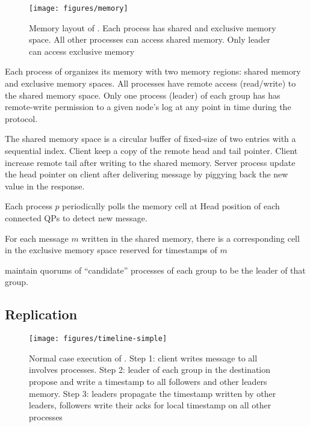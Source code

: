 \begin{figure}[ht!]
  \centering
  \texttt{[image: figures/memory]}
  \caption{Memory layout of \libname. Each process has shared and exclusive memory
  space. All other processes can access shared memory. Only leader can access
  exclusive memory }
  \label{fig:normal_operation_time}
\end{figure}


Each process of \libname organizes its memory with two memory regions: shared
memory and exclusive memory spaces. All processes have remote access
(read/write) to the shared memory space. Only one process (leader) of each group
has has remote-write permission to a given node’s log at any point in time
during the protocol.

The shared memory space is a circular buffer of fixed-size of two entries with a
sequential index. Client keep a copy of the remote head and tail pointer. Client
increase remote tail after writing to the shared memory. Server process update
the head pointer on client after delivering message by piggying back the new
value in the response.

Each process $p$ periodically polls the memory cell at Head position of each
connected QPs to detect new message.

For each message $m$ written in the shared memory, there is a corresponding cell
in the exclusive memory space reserved for timestamps of $m$

\libname maintain quorums of ``candidate'' processes of each group to be the leader of that group.

\subsection{Replication}

\begin{figure}[ht!]
  \centering
  \texttt{[image: figures/timeline-simple]}
  \caption{Normal case execution of \libname. Step 1: client writes message to all
          involves processes. Step 2: leader of each group in the destination
          propose and write a timestamp to all followers and other leaders
          memory. Step 3: leaders propagate the timestamp written by other
          leaders, followers write their acks for local timestamp on all other
          processes}
  \label{fig:normal_operation_time}
\end{figure}




